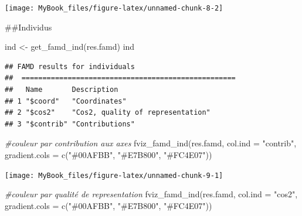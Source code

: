 \documentclass[
  12pt,
  american,
  a4paper,
  extrafontsizes,onecolumn,openright
  ]{memoir}
\newenvironment{Shaded}{\begin{snugshade}}{\end{snugshade}}
\newcommand{\AttributeTok}[1]{\textcolor[rgb]{0.77,0.63,0.00}{#1}}
\newcommand{\CommentTok}[1]{\textcolor[rgb]{0.56,0.35,0.01}{\textit{#1}}}
\newcommand{\FunctionTok}[1]{\textcolor[rgb]{0.00,0.00,0.00}{#1}}
\newcommand{\NormalTok}[1]{#1}
\newcommand{\OtherTok}[1]{\textcolor[rgb]{0.56,0.35,0.01}{#1}}
\newcommand{\StringTok}[1]{\textcolor[rgb]{0.31,0.60,0.02}{#1}}
\begin{document}
\begin{center}\texttt{[image: MyBook\_files/figure-latex/unnamed-chunk-8-2]} \end{center}

\normalsize

\#\#Individus

\scriptsize

\begin{Shaded}
\begin{Highlighting}[]
\NormalTok{ind }\OtherTok{\textless{}{-}} \FunctionTok{get\_famd\_ind}\NormalTok{(res.famd)}
\NormalTok{ind}
\end{Highlighting}
\end{Shaded}

\begin{verbatim}
## FAMD results for individuals 
##  ===================================================
##   Name       Description                      
## 1 "$coord"   "Coordinates"                    
## 2 "$cos2"    "Cos2, quality of representation"
## 3 "$contrib" "Contributions"
\end{verbatim}

\begin{Shaded}
\begin{Highlighting}[]
\CommentTok{\#couleur par contribution aux axes}
\FunctionTok{fviz\_famd\_ind}\NormalTok{(res.famd, }\AttributeTok{col.ind =} \StringTok{"contrib"}\NormalTok{,}
             \AttributeTok{gradient.cols =} \FunctionTok{c}\NormalTok{(}\StringTok{"\#00AFBB"}\NormalTok{, }\StringTok{"\#E7B800"}\NormalTok{, }\StringTok{"\#FC4E07"}\NormalTok{))}
\end{Highlighting}
\end{Shaded}

\begin{center}\texttt{[image: MyBook\_files/figure-latex/unnamed-chunk-9-1]} \end{center}

\begin{Shaded}
\begin{Highlighting}[]
\CommentTok{\#couleur par qualité de representation}
\FunctionTok{fviz\_famd\_ind}\NormalTok{(res.famd, }\AttributeTok{col.ind =} \StringTok{"cos2"}\NormalTok{,}
             \AttributeTok{gradient.cols =} \FunctionTok{c}\NormalTok{(}\StringTok{"\#00AFBB"}\NormalTok{, }\StringTok{"\#E7B800"}\NormalTok{, }\StringTok{"\#FC4E07"}\NormalTok{))}
\end{Highlighting}
\end{Shaded}
\end{document}
